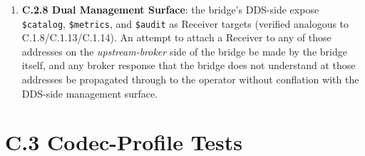 \documentclass{../styles/zerodds-vendor-spec}
\begin{document}
\begin{enumerate}
        (a)~The test publishes a DDS sample (DDS-side) whose
        outbound AMQP transfer carries a
        \texttt{dds:bridge-id} application-property already
        containing the bridge's own configured
        \texttt{bridge\_id}. The bridge  forward
        the sample to the broker and  increment
        \texttt{transfers.dropped.loop} by one (observable via
        the bridge's \texttt{\$metrics} surface).
        (b)~A broker-originated transfer with
        \texttt{dds:bridge-hop} equal to
        \texttt{bridge\_hop\_cap} arrives on the bridge's inbound
        Receiver link. The bridge  publish to
        DDS and  increment
        \texttt{transfers.dropped.hop-cap} by one.
  \item \textbf{C.2.8 Dual Management Surface}: the bridge's
        DDS-side  expose \texttt{\$catalog},
        \texttt{\$metrics}, and \texttt{\$audit} as Receiver
        targets (verified analogous to C.1.8/C.1.13/C.1.14). An
        attempt to attach a Receiver to any of those addresses
        on the \emph{upstream-broker} side of the bridge
         be made by the bridge itself, and any
        broker response that the bridge does not understand at
        those addresses  be propagated through to
        the operator without conflation with the DDS-side
        management surface.
\end{enumerate}

\section*{C.3 Codec-Profile Tests}
\end{document}
